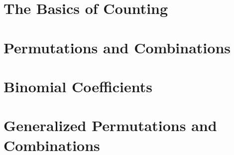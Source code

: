 \documentclass[./Discrete Math.tex]{subfiles}
\begin{document}
	\section{The Basics of Counting}
	\setcounter{section}{2}
	\section{Permutations and Combinations}
	\section{Binomial Coefficients}
	\section{Generalized Permutations and Combinations}	
\end{document}
